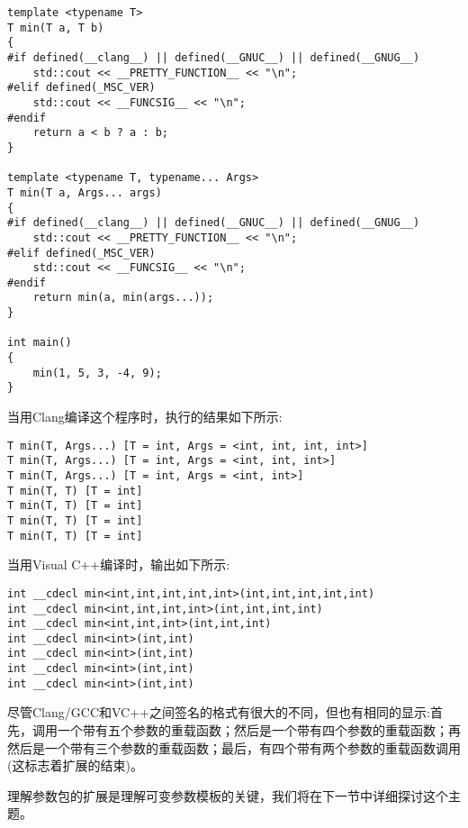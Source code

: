 \begin{lstlisting}[style=styleCXX]
template <typename T>
T min(T a, T b)
{
#if defined(__clang__) || defined(__GNUC__) || defined(__GNUG__)
	std::cout << __PRETTY_FUNCTION__ << "\n";
#elif defined(_MSC_VER)
	std::cout << __FUNCSIG__ << "\n";
#endif
	return a < b ? a : b;
}

template <typename T, typename... Args>
T min(T a, Args... args)
{
#if defined(__clang__) || defined(__GNUC__) || defined(__GNUG__)
	std::cout << __PRETTY_FUNCTION__ << "\n";
#elif defined(_MSC_VER)
	std::cout << __FUNCSIG__ << "\n";
#endif
	return min(a, min(args...));
}

int main()
{
	min(1, 5, 3, -4, 9);
}
\end{lstlisting}

当用Clang编译这个程序时，执行的结果如下所示:

\begin{lstlisting}[style=styleCXX]
T min(T, Args...) [T = int, Args = <int, int, int, int>]
T min(T, Args...) [T = int, Args = <int, int, int>]
T min(T, Args...) [T = int, Args = <int, int>]
T min(T, T) [T = int]
T min(T, T) [T = int]
T min(T, T) [T = int]
T min(T, T) [T = int]
\end{lstlisting}

当用Visual C++编译时，输出如下所示:

\begin{lstlisting}[style=styleCXX]
int __cdecl min<int,int,int,int,int>(int,int,int,int,int)
int __cdecl min<int,int,int,int>(int,int,int,int)
int __cdecl min<int,int,int>(int,int,int)
int __cdecl min<int>(int,int)
int __cdecl min<int>(int,int)
int __cdecl min<int>(int,int)
int __cdecl min<int>(int,int)
\end{lstlisting}

尽管Clang/GCC和VC++之间签名的格式有很大的不同，但也有相同的显示:首先，调用一个带有五个参数的重载函数；然后是一个带有四个参数的重载函数；再然后是一个带有三个参数的重载函数；最后，有四个带有两个参数的重载函数调用(这标志着扩展的结束)。

理解参数包的扩展是理解可变参数模板的关键，我们将在下一节中详细探讨这个主题。



